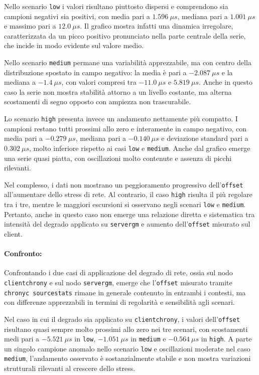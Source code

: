 Nello scenario \texttt{low} i valori risultano piuttosto dispersi e comprendono
sia campioni negativi sia positivi, con media pari a $1.596~\mu s$, mediana pari
a $1 .001~\mu s$ e massimo pari a $12.0~\mu s$. Il grafico mostra infatti una dinamica
irregolare, caratterizzata da un picco positivo pronunciato nella parte centrale
della serie, che incide in modo evidente sul valore medio.

Nello scenario \texttt{medium} permane una variabilità apprezzabile, ma con centro
della distribuzione spostato in campo negativo: la media è pari a
$-2.087~ \mu s$ e la mediana a $-1.4~\mu s$, con valori compresi tra $-11.0~\mu s$
e $5.819~\mu s$. Anche in questo caso la serie non mostra stabilità attorno a un
livello costante, ma alterna scostamenti di segno opposto con ampiezza non trascurabile.

Lo scenario \texttt{high} presenta invece un andamento nettamente più compatto. I
campioni restano tutti prossimi allo zero e interamente in campo negativo, con
media pari a $-0.279~\mu s$, mediana pari a $-0.140~\mu s$ e deviazione standard pari
a $0.302~\mu s$, molto inferiore rispetto ai casi \texttt{low} e \texttt{medium}.
Anche dal grafico emerge una serie quasi piatta, con oscillazioni molto
contenute e assenza di picchi rilevanti.

Nel complesso, i dati non mostrano un peggioramento progressivo dell’\texttt{offset}
all’aumentare dello stress di rete. Al contrario, il caso \texttt{high} risulta
il più regolare tra i tre, mentre le maggiori escursioni si osservano negli scenari
\texttt{low} e \texttt{medium}. Pertanto, anche in questo caso non emerge una relazione
diretta e sistematica tra intensità del degrado applicato su \texttt{servergm} e
aumento dell’\texttt{offset} misurato sul client.

\paragraph*{Confronto:}
Confrontando i due casi di applicazione del degrado di rete, ossia sul nodo
\texttt{clientchrony} e sul nodo \texttt{servergm}, emerge che l’\texttt{offset} misurato
tramite \texttt{chronyc sourcestats} rimane in generale contenuto in entrambi i
contesti, ma con differenze apprezzabili in termini di regolarità e sensibilità agli
scenari.

Nel caso in cui il degrado sia applicato su \texttt{clientchrony}, i valori dell’\texttt{offset}
risultano quasi sempre molto prossimi allo zero nei tre scenari, con scostamenti
medi pari a $-5.521~\mu s$ in \texttt{low}, $-1.051~\mu s$ in \texttt{medium} e $-
0.564~\mu s$ in \texttt{high}. A parte un singolo campione anomalo nello scenario
\texttt{low} e oscillazioni moderate nel caso \texttt{medium}, l’andamento
osservato è sostanzialmente stabile e non mostra variazioni strutturali
rilevanti al crescere dello stress.

